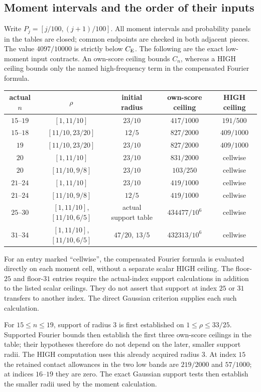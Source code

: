 \subsection{Moment intervals and the order of their inputs}
Write $P_j=[j/100,(j+1)/100]$. All moment intervals and probability
panels in the tables are closed; common endpoints are checked in both
adjacent pieces. The value $4097/10000$ is strictly below $C_{\mathrm E}$.
The following are the exact low-moment input contracts. An own-score
ceiling bounds $C_n$, whereas a HIGH ceiling bounds only the named
high-frequency term in the compensated Fourier formula.
\begin{center}\small
\begin{tabular}{c|c|c|c|c}
actual $n$ & $\rho$ & initial radius & own-score ceiling & HIGH ceiling\\\hline
$15$--$19$ & $[1,11/10]$ & $23/10$ & $417/1000$ & $191/500$\\
$15$--$18$ & $[11/10,23/20]$ & $12/5$ & $827/2000$ & $409/1000$\\
$19$ & $[11/10,23/20]$ & $23/10$ & $827/2000$ & $409/1000$\\
$20$ & $[1,11/10]$ & $23/10$ & $831/2000$ & cellwise\\
$20$ & $[11/10,9/8]$ & $23/10$ & $103/250$ & cellwise\\
$21$--$24$ & $[1,11/10]$ & $23/10$ & $419/1000$ & cellwise\\
$21$--$24$ & $[11/10,9/8]$ & $12/5$ & $419/1000$ & cellwise\\
$25$--$30$ & $[1,11/10]$, $[11/10,6/5]$
 & actual support table & $434477/10^6$ & cellwise\\
$31$--$34$ & $[1,11/10]$, $[11/10,6/5]$
 & $47/20$, $13/5$ & $432313/10^6$ & cellwise
\end{tabular}
\end{center}
For an entry marked ``cellwise'', the compensated Fourier formula is
evaluated directly on each moment cell, without a separate scalar HIGH ceiling.
The floor-$25$ and floor-$31$ entries require the actual-index support
calculations in addition to the listed scalar ceilings. They do not
assert that support at index $25$ or $31$ transfers to another index.
The direct Gaussian criterion supplies each such calculation.

For $15\le n\le19$, support of radius $3$ is first established on
$1\le\rho\le33/25$. Supported Fourier bounds then establish the first
three own-score ceilings in the table; their hypotheses therefore do
not depend on the later, smaller support radii. The HIGH computation
uses this already acquired radius $3$. At index $15$ the retained
contact allowances in the two low bands are $219/2000$ and $57/1000$;
at indices $16$--$19$ they are zero. The exact Gaussian support tests
then establish the smaller radii used by the moment calculation.

